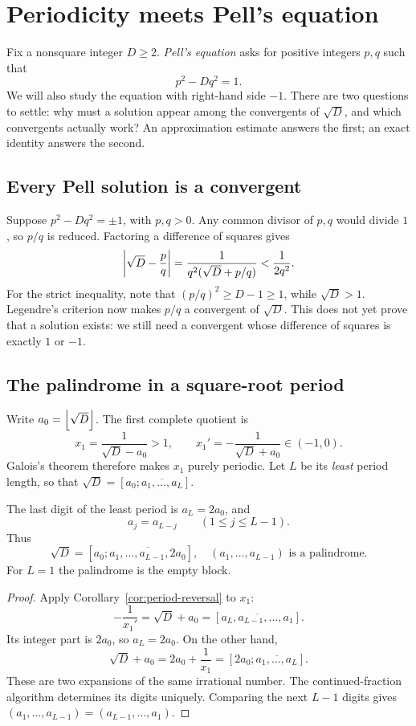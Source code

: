 \section{Periodicity meets Pell's equation}
\label{sec:pell}

Fix a nonsquare integer $D\ge2$. \emph{Pell's equation} asks for positive
integers $p,q$ such that
\[
 p^2-Dq^2=1.
\]
We will also study the equation with right-hand side $-1$. There are two
questions to settle: why must a solution appear among the convergents of
$\sqrt D$, and which convergents actually work? An approximation estimate
answers the first; an exact identity answers the second.

\subsection*{Every Pell solution is a convergent}
Suppose $p^2-Dq^2=\pm1$, with $p,q>0$. Any common divisor of $p,q$ would
divide $1$, so $p/q$ is reduced. Factoring a difference of squares gives
\begin{equation}\label{eq:pell-error}
 \left|\sqrt D-\frac pq\right|
 =\frac{1}{q^2(\sqrt D+p/q)}
 <\frac{1}{2q^2}.
\end{equation}
For the strict inequality, note that
$(p/q)^2\ge D-1\ge1$, while $\sqrt D>1$.
Legendre's criterion now makes $p/q$ a convergent of $\sqrt D$.
This does not yet prove that a solution exists: we still need a convergent
whose difference of squares is exactly $1$ or $-1$.

\subsection*{The palindrome in a square-root period}
Write $a_0=\left\lfloor \sqrt D\right\rfloor$. The first complete quotient is
\[
 x_1=\frac1{\sqrt D-a_0}>1,
 \qquad x_1'=-\frac1{\sqrt D+a_0}\in(-1,0).
\]
Galois's theorem therefore makes $x_1$ purely periodic. Let $L$ be its
\emph{least} period length, so that
$\sqrt D=[a_0;\overline{a_1,\ldots,a_L}]$.

\begin{theorem}
\label{thm:sqrt-palindrome}
The last digit of the least period is $a_L=2a_0$, and
\[
 a_j=a_{L-j}\qquad(1\le j\le L-1).
\]
Thus
\[
 \boxed{\quad
 \sqrt D=[a_0;\overline{a_1,\ldots,a_{L-1},2a_0}],
 \quad (a_1,\ldots,a_{L-1})\text{ is a palindrome}.
 \quad}
\]
For $L=1$ the palindrome is the empty block.
\end{theorem}
\begin{proof}
Apply Corollary~\ref{cor:period-reversal} to $x_1$:
\[
 -\frac1{x_1'}=\sqrt D+a_0
   =[\overline{a_L,a_{L-1},\ldots,a_1}].
\]
Its integer part is $2a_0$, so $a_L=2a_0$. On the other hand,
\[
 \sqrt D+a_0=2a_0+\frac1{x_1}
   =[2a_0;\overline{a_1,\ldots,a_L}].
\]
These are two expansions of the same irrational number. The
continued-fraction algorithm determines its digits uniquely. Comparing
the next $L-1$ digits gives
$(a_1,\ldots,a_{L-1})=(a_{L-1},\ldots,a_1)$.
\end{proof}

